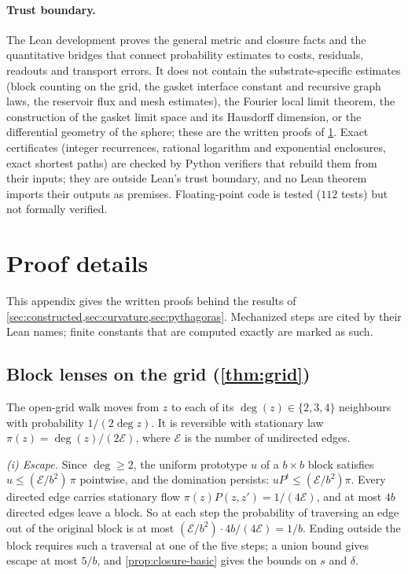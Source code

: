 \documentclass[11pt]{article}
\begin{document}
\paragraph{Trust boundary.}
The Lean development proves the general metric and closure facts and the quantitative bridges that connect probability estimates to costs, residuals, readouts and transport errors.
It does not contain the substrate-specific estimates (block counting on the grid, the gasket interface constant and recursive graph laws, the reservoir flux and mesh estimates), the Fourier local limit theorem, the construction of the gasket limit space and its Hausdorff dimension, or the differential geometry of the sphere; these are the written proofs of \cref{app:proofs}.
Exact certificates (integer recurrences, rational logarithm and exponential enclosures, exact shortest paths) are checked by Python verifiers that rebuild them from their inputs; they are outside Lean's trust boundary, and no Lean theorem imports their outputs as premises.
Floating-point code is tested ($112$ tests) but not formally verified.
 \section{Proof details}
\label{app:proofs}

This appendix gives the written proofs behind the results of \cref{sec:constructed,sec:curvature,sec:pythagoras}.
Mechanized steps are cited by their Lean names; finite constants that are computed exactly are marked as such.

\subsection{Block lenses on the grid (\texorpdfstring{\cref{thm:grid}}{Theorem 6.1})}
\label{app:grid-proof}

The open-grid walk moves from $z$ to each of its $\deg(z)\in\{2,3,4\}$ neighbours with probability $1/(2\deg z)$.
It is reversible with stationary law $\pi(z)=\deg(z)/(2\mathcal E)$, where $\mathcal E$ is the number of undirected edges.

\emph{(i) Escape.}
Since $\deg\ge2$, the uniform prototype $u$ of a $b\times b$ block satisfies $u\le(\mathcal E/b^2)\,\pi$ pointwise, and the domination persists: $uP^t\le(\mathcal E/b^2)\pi$.
Every directed edge carries stationary flow $\pi(z)P(z,z')=1/(4\mathcal E)$, and at most $4b$ directed edges leave a block.
So at each step the probability of traversing an edge out of the original block is at most $(\mathcal E/b^2)\cdot4b/(4\mathcal E)=1/b$.
Ending outside the block requires such a traversal at one of the five steps; a union bound gives escape at most $5/b$, and \cref{prop:closure-basic} gives the bounds on $s$ and $\delta$.
\end{document}
